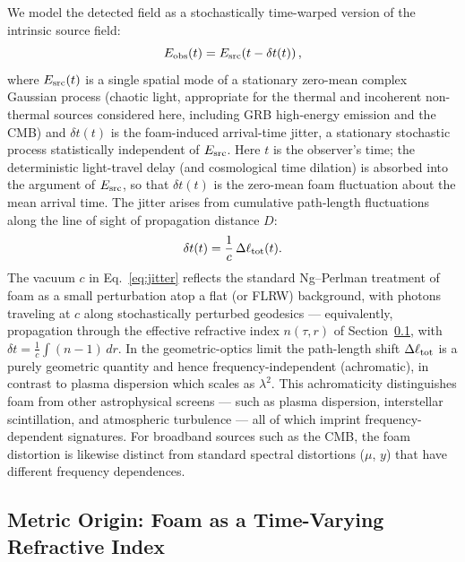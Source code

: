 \documentclass[aps,prd,onecolumn,amsmath,amssymb]{revtex4-2}
\begin{document}
We model the detected field as a stochastically time-warped version of the
intrinsic source field:
\begin{equation}
  E_{\rm obs}(t) = E_{\rm src}\!\left(t - \delta t(t)\right),
  \label{eq:Eobs}
\end{equation}
where $E_{\rm src}(t)$ is a single spatial mode of a stationary zero-mean
complex Gaussian process (chaotic light, appropriate for the thermal and incoherent
non-thermal sources considered here, including GRB high-energy
emission and the CMB) and $\delta t(t)$ is the foam-induced
arrival-time jitter, a stationary stochastic process statistically independent
of $E_{\rm src}$.  Here $t$ is the observer's time; the deterministic
light-travel delay (and cosmological time dilation) is absorbed into the
argument of $E_{\rm src}$, so that $\delta t(t)$ is the zero-mean foam
fluctuation about the mean arrival time.
The jitter arises from cumulative path-length fluctuations along the
line of sight of propagation distance $D$:
\begin{equation}
  \delta t(t) = \frac{1}{c}\,\Delta\ell_{\rm tot}(t).
  \label{eq:jitter}
\end{equation}
The vacuum $c$ in Eq.~\eqref{eq:jitter} reflects the standard
Ng--Perlman treatment of foam as a small perturbation atop a flat
(or FLRW) background, with photons traveling at $c$ along
stochastically perturbed geodesics --- equivalently, propagation through the
effective refractive index $n(\tau,r)$ of Section~\ref{sec:metric_origin},
with $\delta t=\tfrac1c\int(n-1)\,dr$.
In the geometric-optics limit the path-length shift $\Delta\ell_{\rm tot}$
is a purely geometric quantity and hence frequency-independent (achromatic),
in contrast to plasma dispersion which scales as $\lambda^2$.
This achromaticity distinguishes foam from other astrophysical screens
--- such as plasma dispersion, interstellar scintillation, and atmospheric
turbulence --- all of which imprint frequency-dependent signatures.
For broadband sources such as the CMB, the foam distortion is likewise
distinct from standard spectral distortions ($\mu$, $y$) that have
different frequency dependences. 

\subsection{Metric Origin: Foam as a Time-Varying Refractive Index}
\label{sec:metric_origin}
\end{document}
